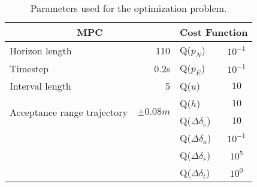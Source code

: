 \begin{table}[h]
\centering
\begin{tabular}{| l r | l c |}
    \hline
    \multicolumn{2}{|c|}{MPC} & \multicolumn{2}{c|}{Cost Function} \\
    \hline
    Horizon length & 110 & Q($p_N$) & $10^{-1}$\\
    Timestep       & 0.2s & Q($p_E$) & $10^{-1}$\\
    Interval length & 5 & Q($u$) & $10$\\
    \multirow{2}{2.5cm}{Acceptance range trajectory} & \multirow{2}{*}{$\pm 0.08m$} & Q($h$) & $10$\\
    & & Q($\Delta \delta_e$) & $10$\\
    & & Q($\Delta \delta_a$) & $10^{-1}$\\
    & & Q($\Delta \delta_r$) & $10^{5}$\\
    & & Q($\Delta \delta_t$) & $10^{0}$\\
    \hline
\end{tabular}
\caption{Parameters used for the optimization problem.}
\label{tab:opt_param}
\end{table}
